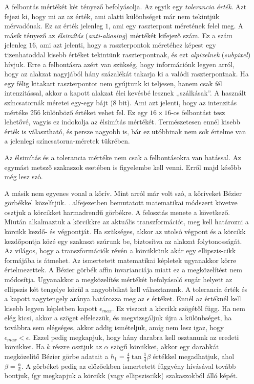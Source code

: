 \documentclass[12pt]{report}
\theoremstyle{definition}
\newcommand{\inenglish}[1]{\textsl{#1}}
\begin{document}
A felbontás mértékét két tényező befolyásolja. Az egyik egy \emph{tolerancia
érték}. Azt fejezi ki, hogy mi az az érték, ami alatti különbséget már nem
tekintjük mérvadónak. Ez az érték jelenleg $1$, ami egy raszterpont méretének
felel meg. A másik tényező az \emph{élsimítás} (\inenglish{anti-aliasing})
mértékét kifejező szám. Ez a szám jelenleg $16$, ami azt jelenti, hogy a
raszterpontok méretéhez képest egy tizenhatoddal kisebb értéket tekintünk
raszterpontnak, és ezt \emph{alpixelnek} (\inenglish{subpixel}) hívjuk. Erre a
felbontásra azért van szükség, hogy információnk legyen arról, hogy az alakzat
nagyjából hány százalékát takarja ki a valódi raszterpontnak. Ha egy félig
kitakart raszterpontot nem gyújtunk ki teljesen, hanem csak fél intenzitással,
akkor a kapott alakzat élei kevésbé lesznek ,,szálkásak''. A használt
színcsatornák méretei egy-egy bájt ($8$ bit). Ami azt jelenti, hogy az
intenzitás mértéke 256 különböző értéket vehet fel. Ez egy $16\times16$-os
felbontást tesz lehetővé, vagyis ez indokolja az élsimítás mértékét.
Természetesen ennél kisebb érték is választható, és persze nagyobb is, bár ez
utóbbinak nem sok értelme van a jelenlegi színcsatorna-méretek tükrében.

Az élsimítás és a tolerancia mértéke nem csak a felbontásokra van hatással. Az
egymást metsző szakaszok esetében is figyelembe kell venni. Erről majd később
még lesz szó.

A másik nem egyenes vonal a körív. Mint arról már volt szó, a köríveket Bézier
görbékkel közelítjük. . alfejezetben bemutatott matematikai
módszert követve osztjuk a körcikket harmadrendű görbékre. A felosztás menete a
következő. Miután alkalmaztuk a körcikkre az aktuális transzformációt, meg kell
határozni a körcikk kezdő- és végpontját. Ha szükséges, akkor az utolsó végpont
és a körcikk kezdőpontja közé egy szakaszt szúrunk be, biztosítva az alakzat
folytonosságát. Az világos, hogy a transzformációk révén a körcikkünk akár egy
ellipszis-cikk formájába is átmehet. Az ismertetett matematikai képletek
ugyanakkor körre értelmezettek. A Bézier görbék affin invarianciája miatt ez a
megközelítést nem módosítja. Ugyanakkor a megközelítés mértékét befolyásoló
sugár helyett az ellipszis két tengelye közül a nagyobbikat kell választanunk. A
tolerancia érték és a kapott nagytengely aránya határozza meg az $\epsilon$
értéket. Ennél az értéknél kell kisebb legyen  képletben kapott
$\epsilon_{max}$. Ez viszont a körcikk szögétől függ. Ha nem elég kicsi, akkor a
szöget elfelezzük, és megvizsgáljuk újra a különbséget, ha továbbra sem
elégséges, akkor addig ismételjük, amíg nem lesz igaz, hogy $\epsilon_{max} <
\epsilon$. Ezzel pedig megkapjuk, hogy hány darabra kell osztanunk az eredeti
körcikket. Ha $k$ részre osztjuk az $\alpha$ szögű körcikket, akkor egy darabkát
megközelítő Bézier görbe adatait a $h_1 = \frac{4}{3} \tan{\frac{1}{4} \beta}$
értékkel megadhatjuk, ahol $\beta = \frac{\alpha}{k}$. A görbéket pedig az
előzőekben ismertetett függvény hívásával tovább bontjuk, így megkapjuk a
körcikk (vagy ellipsziscikk) szakaszokból álló képét.
\end{document}
